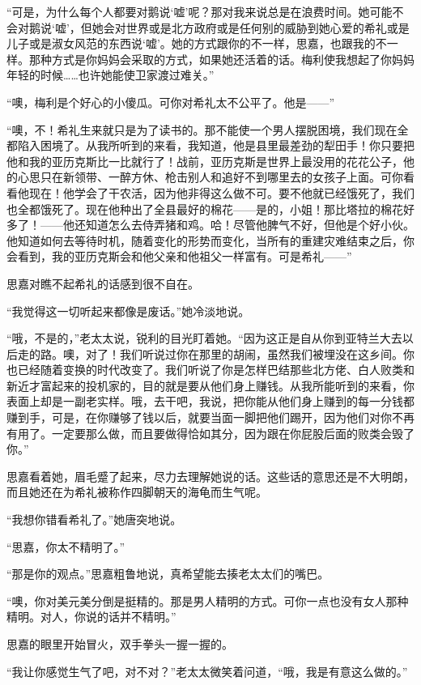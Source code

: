\par “可是，为什么每个人都要对鹅说‘嘘’呢？那对我来说总是在浪费时间。她可能不会对鹅说‘嘘’，但她会对世界或是北方政府或是任何别的威胁到她心爱的希礼或是儿子或是淑女风范的东西说‘嘘’。她的方式跟你的不一样，思嘉，也跟我的不一样。那种方式是你妈妈会采取的方式，如果她还活着的话。梅利使我想起了你妈妈年轻的时候……也许她能使卫家渡过难关。”
\par “噢，梅利是个好心的小傻瓜。可你对希礼太不公平了。他是——”
\par “噢，不！希礼生来就只是为了读书的。那不能使一个男人摆脱困境，我们现在全都陷入困境了。从我所听到的来看，我知道，他是县里最差劲的犁田手！你只要把他和我的亚历克斯比一比就行了！战前，亚历克斯是世界上最没用的花花公子，他的心思只在新领带、一醉方休、枪击别人和追好不到哪里去的女孩子上面。可你看看他现在！他学会了干农活，因为他非得这么做不可。要不他就已经饿死了，我们也全都饿死了。现在他种出了全县最好的棉花——是的，小姐！那比塔拉的棉花好多了！——他还知道怎么去侍弄猪和鸡。哈！尽管他脾气不好，但他是个好小伙。他知道如何去等待时机，随着变化的形势而变化，当所有的重建灾难结束之后，你会看到，我的亚历克斯会和他父亲和他祖父一样富有。可是希礼——”
\par 思嘉对瞧不起希礼的话感到很不自在。
\par “我觉得这一切听起来都像是废话。”她冷淡地说。
\par “哦，不是的，”老太太说，锐利的目光盯着她。“因为这正是自从你到亚特兰大去以后走的路。噢，对了！我们听说过你在那里的胡闹，虽然我们被埋没在这乡间。你也已经随着变换的时代改变了。我们听说了你是怎样巴结那些北方佬、白人败类和新近才富起来的投机家的，目的就是要从他们身上赚钱。从我所能听到的来看，你表面上却是一副老实样。哦，去干吧，我说，把你能从他们身上赚到的每一分钱都赚到手，可是，在你赚够了钱以后，就要当面一脚把他们踢开，因为他们对你不再有用了。一定要那么做，而且要做得恰如其分，因为跟在你屁股后面的败类会毁了你。”
\par 思嘉看着她，眉毛蹙了起来，尽力去理解她说的话。这些话的意思还是不大明朗，而且她还在为希礼被称作四脚朝天的海龟而生气呢。
\par “我想你错看希礼了。”她唐突地说。
\par “思嘉，你太不精明了。”
\par “那是你的观点。”思嘉粗鲁地说，真希望能去揍老太太们的嘴巴。
\par “噢，你对美元美分倒是挺精的。那是男人精明的方式。可你一点也没有女人那种精明。对人，你说的话并不精明。”
\par 思嘉的眼里开始冒火，双手拳头一握一握的。
\par “我让你感觉生气了吧，对不对？”老太太微笑着问道，“哦，我是有意这么做的。”
